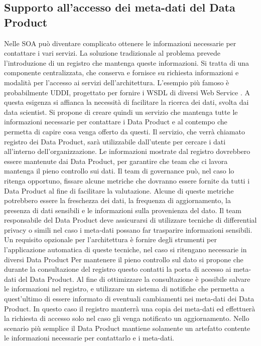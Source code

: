 \documentclass[12pt]{report}
\begin{document}
\subsection{Supporto all'accesso dei meta-dati del Data Product}
Nelle SOA può diventare complicato ottenere le informazioni necessarie per contattare i vari servizi.
La soluzione tradizionale al problema prevede l'introduzione di un registro che mantenga queste informazioni. 
Si tratta di una componente centralizzata, che conserva e fornisce su richiesta informazioni e modalità per l'accesso ai servizi dell'architettura.
L'esempio più famoso è probabilmente UDDI, progettato per fornire i WSDL di diversi Web Service \cite{curbera2002unraveling}.
A questa esigenza si affianca la necessità di facilitare  la ricerca dei dati, svolta dai data scientist.
Si propone di creare quindi un servizio che mantenga tutte le informazioni necessarie per contattare i Data Product e al contempo che permetta di capire cosa venga offerto da questi.
Il servizio, che verrà chiamato registro dei Data Product, sarà utilizzabile dall'utente per cercare i dati all'interno dell'organizzazione. 
Le informazioni mostrate dal registro dovrebbero essere mantenute dai Data Product, per garantire che team che ci lavora mantenga il pieno controllo sui dati.
Il team di governance può, nel caso lo ritenga opportuno, fissare alcune metriche che dovranno essere fornite da tutti i Data Product al fine di facilitare la valutazione.
Alcune di queste metriche potrebbero essere la freschezza dei dati, la frequenza di aggiornamento, la presenza di dati sensibili e le informazioni sulla provenienza del dato.
Il team responsabile del Data Product deve assicurarsi di utilizzare tecniche di differential privacy o simili nel caso i meta-dati possano far trasparire informazioni sensibili.
Un requisito opzionale per l'architettura è fornire degli strumenti per l'applicazione automatica di queste tecniche, nel caso si ritengano necessarie in diversi Data Product
Per mantenere il pieno controllo sul dato si propone che durante la consultazione del registro questo contatti la porta di accesso ai meta-dati del Data Product.
Al fine di ottimizzare la consultazione è possibile salvare le informazioni nel registro, e utilizzare un sistema di notifiche che permetta a quest'ultimo di essere informato di eventuali cambiamenti nei meta-dati dei Data Product.
In questo caso il registro manterrà una copia dei meta-dati ed effettuerà la richiesta di accesso solo nel caso gli venga notificato un aggiornamento.
Nello scenario più semplice il Data Product mantiene solamente un artefatto contente le informazioni necessarie per contattarlo e i meta-dati.
\end{document}
